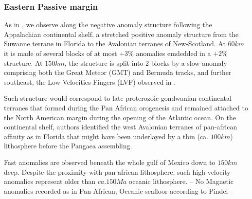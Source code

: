 \documentclass[12pt]{article}
\begin{document}
	\subsubsection{Eastern Passive margin}
		As in \cite{schaeffer2014imaging,yuan2014lithospheric,james2014rayleigh,silveira2002anisotropic,mocquet1990three}, we observe along the negative anomaly structure following the Appalachian continental shelf, a stretched positive anomaly structure from the Suwanne terrane in Florida to the Avalonian terranes of New-Scotland. 
		At $60km$ it is made of several blocks of at most $+3\%$ anomalies emdedded in a $+2\%$ structure. At $150km$, the structure is split into 2 blocks by a slow anomaly comprising both the Great Meteor (GMT) and Bermuda tracks, and further southeast, the Low Velocities Fingers (LVF) observed in \cite{french2013waveform}. 

		Such structure would correspond to late proterozoic gondwanian continental terranes that formed during the Pan African orogenesis \citep{kennedy1964structural} and remained attached to the North American margin during the opening of the Atlantic ocean. \citep[e.g.][]{thomas2006tectonic}
		On the continental shelf, authors \citep[e.g.][]{o1983avalon,nance2002cordilleran} identified the west Avalonian terranes of pan-african affinity as in Florida \citep[see][]{smith1982review} that might have been underlayed by a thin (ca. $100km$) lithosphere before the Pangaea assembling. \citep{mckenzie2015lithospheric}

		Fast anomalies are observed beneath the whole gulf of Mexico down to $150km$ deep. Despite the proximity with pan-african lithosphere, such high velocity anomalies represent older than $ca. 150Ma$ oceanic lithosphere. \citep{muller2008age,pindell2009tectonic}
		-- No Magnetic anomalies recorded as in Pan African, Oceanic seafloor according to Pindel --


\end{document}
